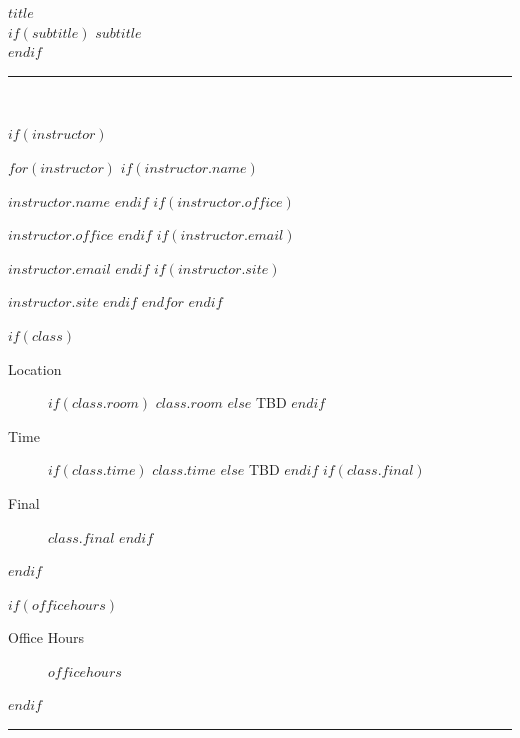 \noindent\hfil\textbf{\huge $title$}\hfil\\
$if(subtitle)$
\hfil$subtitle$\hfil\\
$endif$


% 
\noindent
\rule{\linewidth}{.5pt}\\
\begin{minipage}[t]{.57\linewidth}
$if(instructor)$
\begin{description}
$for(instructor)$
  $if(instructor.name)$   \item[Instructor] $instructor.name$                                               $endif$
  $if(instructor.office)$ \item[Office]     $instructor.office$                                             $endif$
  $if(instructor.email)$  \item[E-mail]     \href{mailto://$instructor.email$}{\texttt{$instructor.email$}} $endif$
  $if(instructor.site)$   \item[Web Page]   \href{http://$instructor.site$}{$instructor.site$}              $endif$
$endfor$
$endif$ 
\end{description}
\end{minipage}\hfill\begin{minipage}[t]{.42\linewidth}
$if(class)$
  \begin{description}
  \item[Location]   $if(class.room)$ $class.room$ $else$ TBD $endif$
  \item[Time]       $if(class.time)$ $class.time$ $else$ TBD $endif$
  $if(class.final)  $\item[Final] $class.final$ $endif$
  \end{description}
$endif$
\end{minipage}
$if(officehours)$ \vspace{-.5em} \begin{description} \item[Office Hours] $officehours$ \end{description} $endif$
\vspace{-1em}\rule{\linewidth}{.5pt}